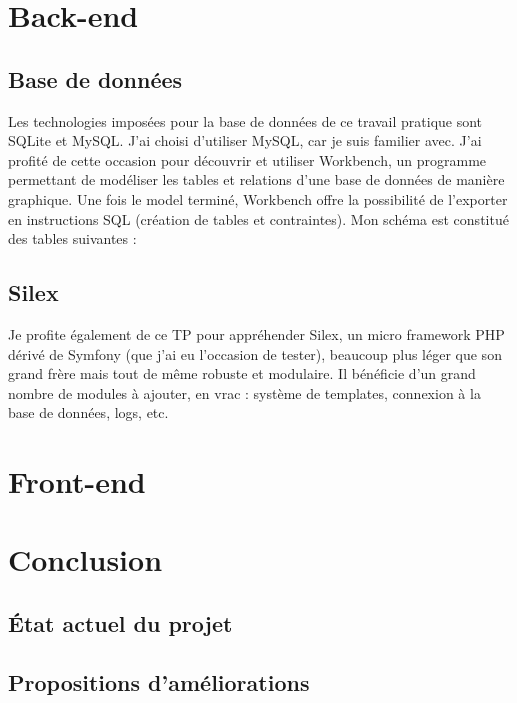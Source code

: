\documentclass[a4paper, 11pt]{article}
\begin{document}
\section{Back-end}
\subsection{Base de données}
Les technologies imposées pour la base de données de ce travail pratique sont SQLite et MySQL. J'ai choisi d'utiliser 
MySQL, car je suis familier avec. J'ai profité de cette occasion pour découvrir et utiliser Workbench, un programme 
permettant de modéliser les tables et relations d'une base de données de manière graphique. Une fois le model terminé, 
Workbench offre la possibilité de l'exporter en instructions SQL (création de tables et contraintes).
\bigbreak
Mon schéma est constitué des tables suivantes :

\subsection{Silex}
Je profite également de ce TP pour appréhender Silex, un micro framework PHP dérivé de Symfony (que j'ai eu l'occasion 
de tester), beaucoup plus léger que son grand frère mais tout de même robuste et modulaire. Il bénéficie d'un 
grand nombre de modules à ajouter, en vrac : système de templates, connexion à la base de données, logs, etc.





\section{Front-end}



\section{Conclusion}
\subsection{État actuel du projet}

\subsection{Propositions d'améliorations}
\end{document}
